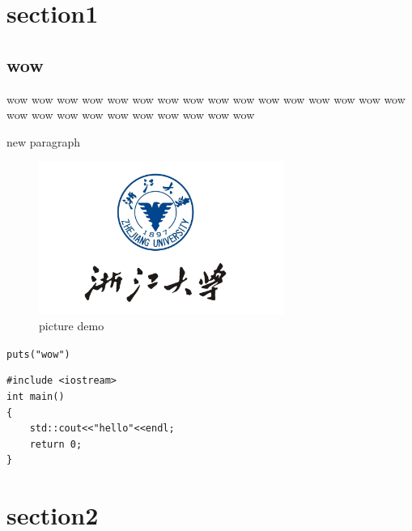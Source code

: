 \newpage
\section{section1}
\subsection{wow}
wow wow wow wow wow wow wow wow wow wow wow wow wow wow wow wow wow wow wow
wow wow wow wow wow wow wow
\par
new paragraph
\\
\begin{figure}[h] %
    \centering
    \includegraphics[width=8cm]{title/logo.png} %
    \caption{picture demo}           %
\end{figure}

\verb|puts("wow")| %

\par
\lstset{language=C++}
\begin{lstlisting}[caption = code demo]
#include <iostream>
int main()
{
    std::cout<<"hello"<<endl;
    return 0;
}
\end{lstlisting}
\section{section2}
